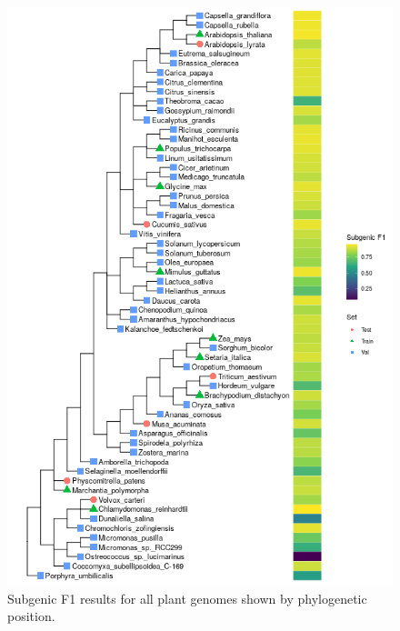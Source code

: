 \documentclass{article}
\begin{document}
\clearpage
\begin{figure}[!h]
\renewcommand\thefigure{S3}
\centerline{\includegraphics[width=1.0\textwidth]{images/plants_f1_scores}}
\caption{Subgenic F1 results for all plant genomes shown by phylogenetic position.}
\end{figure}
\end{document}
